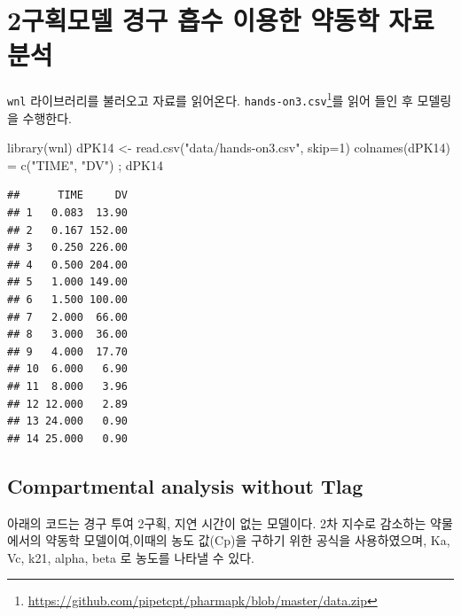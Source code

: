 \documentclass[
  11pt,
  krantz2, a4paper, twoside]{krantz}
\newenvironment{Shaded}{\begin{snugshade}}{\end{snugshade}}
\newcommand{\AttributeTok}[1]{\textcolor[rgb]{0.77,0.63,0.00}{#1}}
\newcommand{\DecValTok}[1]{\textcolor[rgb]{0.00,0.00,0.81}{#1}}
\newcommand{\FunctionTok}[1]{\textcolor[rgb]{0.00,0.00,0.00}{#1}}
\newcommand{\NormalTok}[1]{#1}
\newcommand{\OtherTok}[1]{\textcolor[rgb]{0.56,0.35,0.01}{#1}}
\newcommand{\StringTok}[1]{\textcolor[rgb]{0.31,0.60,0.02}{#1}}
\theoremstyle{definition}
\theoremstyle{definition}
\theoremstyle{definition}
\theoremstyle{definition}
\theoremstyle{remark}
\begin{document}
\hypertarget{uxad6cuxd68duxbaa8uxb378-uxacbduxad6c-uxd761uxc218-uxc774uxc6a9uxd55c-uxc57duxb3d9uxd559-uxc790uxb8cc-uxbd84uxc11d}{%
\section{\texorpdfstring{2구획모델 경구 흡수 이용한 약동학 자료 분석}{2구획모델 경구 흡수 이용한 약동학 자료 분석}}\label{uxad6cuxd68duxbaa8uxb378-uxacbduxad6c-uxd761uxc218-uxc774uxc6a9uxd55c-uxc57duxb3d9uxd559-uxc790uxb8cc-uxbd84uxc11d}}

\texttt{wnl} 라이브러리를 불러오고 자료를 읽어온다.
\texttt{hands-on3.csv}\footnote{\url{https://github.com/pipetcpt/pharmapk/blob/master/data.zip}}를 읽어 들인 후 모델링을 수행한다.

\begin{Shaded}
\begin{Highlighting}[]
\FunctionTok{library}\NormalTok{(wnl)}
\NormalTok{dPK14 }\OtherTok{\textless{}{-}} \FunctionTok{read.csv}\NormalTok{(}\StringTok{"data/hands{-}on3.csv"}\NormalTok{, }\AttributeTok{skip=}\DecValTok{1}\NormalTok{)}
\FunctionTok{colnames}\NormalTok{(dPK14) }\OtherTok{=} \FunctionTok{c}\NormalTok{(}\StringTok{"TIME"}\NormalTok{, }\StringTok{"DV"}\NormalTok{) ; dPK14}
\end{Highlighting}
\end{Shaded}

\begin{verbatim}
##      TIME     DV
## 1   0.083  13.90
## 2   0.167 152.00
## 3   0.250 226.00
## 4   0.500 204.00
## 5   1.000 149.00
## 6   1.500 100.00
## 7   2.000  66.00
## 8   3.000  36.00
## 9   4.000  17.70
## 10  6.000   6.90
## 11  8.000   3.96
## 12 12.000   2.89
## 13 24.000   0.90
## 14 25.000   0.90
\end{verbatim}

\hypertarget{compartmental-analysis-without-tlag-1}{%
\subsection{Compartmental analysis without Tlag}\label{compartmental-analysis-without-tlag-1}}

아래의 코드는 경구 투여 2구획, 지연 시간이 없는 모델이다. 
2차 지수로 감소하는 약물에서의 약동학 모델이여,이때의 농도 값(Cp)을 구하기 위한 공식을 사용하였으며, Ka, Vc, k21, alpha, beta 로 농도를 나타낼 수 있다.
\end{document}

